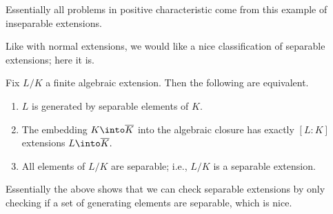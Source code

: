 \begin{remark}
	Essentially all problems in positive characteristic come from this example of inseparable extensions.
\end{remark}
Like with normal extensions, we would like a nice classification of separable extensions; here it is.
\begin{proposition} \label{prop:sepgrabbag}
	Fix $L/K$ a finite algebraic extension. Then the following are equivalent.
	\begin{enumerate}[label=(\alph*)]
		\item $L$ is generated by separable elements of $K.$
		\item The embedding $K\into\overline K$ into the algebraic closure has exactly $[L:K]$ extensions $L\into\overline K.$
		\item All elements of $L/K$ are separable; i.e., $L/K$ is a separable extension.
	\end{enumerate}
\end{proposition}
Essentially the above shows that we can check separable extensions by only checking if a set of generating elements are separable, which is nice.
